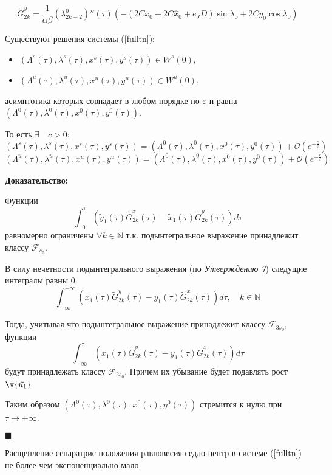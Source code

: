 $$\tilde G_{2k}^y  = \frac{1}{\alpha \beta} (\lambda^0_{2k-2})''(\tau) \left( -(2Cx_0+2C \hat x_0+e_JD) \sin\lambda_0 + 2Cy_0 \cos\lambda_0 \right)$$
\begin{thm}

Существуют решения системы (\ref{fulltn}):
\begin{itemize}
\item $(\Lambda^s(\tau),\lambda^s(\tau),x^s(\tau),y^s(\tau)) \in W^s(0),$
\item $(\Lambda^u(\tau),\lambda^u(\tau),x^u(\tau),y^u(\tau)) \in W^u(0),$
\end{itemize}

асимптотика которых совпадает в любом порядке по $\varepsilon$ и равна $(\Lambda^0(\tau),\lambda^0(\tau),x^0(\tau),y^0(\tau))$.

То есть $\exists \quad c>0:$
$$(\Lambda^s(\tau),\lambda^s(\tau),x^s(\tau),y^s(\tau)) = (\Lambda^0(\tau),\lambda^0(\tau),x^0(\tau),y^0(\tau)) + \mathcal{O}(e^{-\frac{c}{\varepsilon}})$$
$$(\Lambda^u(\tau),\lambda^u(\tau),x^u(\tau),y^u(\tau)) = (\Lambda^0(\tau),\lambda^0(\tau),x^0(\tau),y^0(\tau)) + \mathcal{O}(e^{-\frac{c}{\varepsilon}})$$

\end{thm}
\textbf{Доказательство:}\nopagebreak[4]

Функции 
$$\int_{\text{ } 0}^\tau \left( \tilde y_1(\tau) \tilde G_{2k}^x(\tau) - \tilde x_1(\tau) \tilde G_{2k}^y(\tau) \right) d \tau$$
равномерно ограничены $\forall k \in \mathbb{N}$ т.к. подынтегральное выражение принадлежит классу $\mathcal{F}_{s_0}$.

В силу нечетности подынтегрального выражения (по \textit{Утверждению 7}) следущие интегралы равны 0:
$$\int_{-\infty}^{+\infty} \left( x_1(\tau) \tilde G_{2k}^y(\tau) - y_1(\tau) \tilde G_{2k}^x(\tau) \right) d \tau, \quad k \in \mathbb{N}$$

Тогда, учитывая что подынтегральное выражение принадлежит классу $\mathcal{F}_{3s_0}$, функции
$$\int_{-\infty}^{\tau} \left( x_1(\tau) \tilde G_{2k}^y(\tau) - y_1(\tau) \tilde G_{2k}^x(\tau) \right) d \tau$$
будут принадлежать классу $\mathcal{F}_{2s_0}$. Причем их убывание будет подавлять рост $\v{ \tilde{u_1}}$.

Таким образом $(\Lambda^0(\tau),\lambda^0(\tau),x^0(\tau),y^0(\tau))$ стремится к нулю при $\tau \to \pm \infty$.

$\blacksquare$
\begin{consequence}
Расщепление сепаратрис положения равновесия седло-центр в системе (\ref{fulltn}) не более чем экспоненциально мало. 
\end{consequence}
